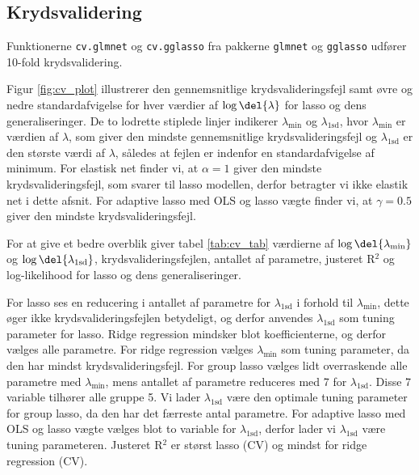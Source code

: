 \subsection{Krydsvalidering}
Funktionerne \texttt{cv.glmnet} og \texttt{cv.gglasso} fra pakkerne \texttt{glmnet} og \texttt{gglasso} udfører 10-fold krydsvalidering.

Figur \ref{fig:cv_plot} illustrerer den gennemsnitlige krydsvalideringsfejl samt øvre og nedre standardafvigelse for hver værdier af $\log \del{\lambda}$ for lasso og dens generaliseringer. 
De to lodrette stiplede linjer indikerer \(\lambda_{\text{min}}\) og \(\lambda_\text{1sd}\), hvor \(\lambda_{\text{min}}\) er værdien af \(\lambda\), som giver den mindste gennemsnitlige krydsvalideringsfejl og \(\lambda_\text{1sd}\) er den største værdi af \(\lambda\), således at fejlen er indenfor en standardafvigelse af minimum. 
For elastisk net finder vi, at $\alpha =1$ giver den mindste krydsvalideringsfejl, som svarer til lasso modellen, derfor betragter vi ikke elastik net i dette afsnit. 
For adaptive lasso med OLS og lasso vægte finder vi, at $\gamma = 0.5$ giver den mindste krydsvalideringsfejl. 

%
For at give et bedre overblik giver tabel \ref{tab:cv_tab} værdierne af $\log \del{ \lambda_{\min}}$ og $\log \del{ \lambda_{1\text{sd}}}$, krydsvalideringsfejlen, antallet af parametre, justeret R$^2$ og log-likelihood for lasso og dens generaliseringer.

 

For lasso ses en reducering i antallet af parametre for $\lambda_{1\text{sd}}$ i forhold til $\lambda_{\min}$, dette øger ikke krydsvalideringsfejlen betydeligt, og derfor anvendes $\lambda_{1\text{sd}}$ som tuning parameter for lasso. 
Ridge regression mindsker blot koefficienterne, og derfor vælges alle parametre. 
For ridge regression vælges \(\lambda_{\min}\) som tuning parameter, da den har mindst krydsvalideringsfejl.
For group lasso vælges lidt overraskende alle parametre med \(\lambda_\text{min}\), mens antallet af parametre reduceres med 7 for $\lambda_{1\text{sd}}$. 
Disse 7 variable tilhører alle gruppe 5.
Vi lader $\lambda_{1\text{sd}}$ være den optimale tuning parameter for group lasso, da den har det færreste antal parametre.
For adaptive lasso med OLS og lasso vægte vælges blot to variable for \(\lambda_{1\text{sd}}\), derfor lader vi $\lambda_{1\text{sd}}$ være tuning parameteren.  
Justeret R\(^2\) er størst lasso (CV) og mindst for ridge regression (CV).


